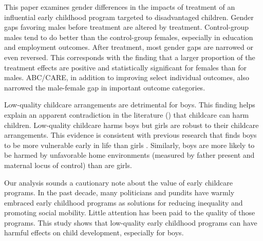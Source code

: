This paper examines gender differences in the impacts of treatment of an influential early childhood program targeted to disadvantaged children. Gender gaps favoring males before treatment are altered by treatment. Control-group males tend to do better than the control-group females, especially in education and employment outcomes. After treatment, most gender gaps are narrowed or even reversed. This corresponds with the finding that a larger proportion of the treatment effects are positive and statistically significant for females than for males. ABC/CARE, in addition to improving select individual outcomes, also narrowed the male-female gap in important outcome categories.

Low-quality childcare arrangements are detrimental for boys. This finding helps explain an apparent contradiction in the literature (\citet{Baker_Gruber_etal_2008_JPE,Baker_Gruber_Milligan_2015_Noncog_Defects,Kottelenberg-Lehrer_2014_Gender-Effects}) that childcare can harm children. Low-quality childcare harms boys but girls are robust to their childcare arrangements. This evidence is consistent with previous research that finds boys to be more vulnerable early in life than girls \citep{golding2016psychology}. Similarly, boys are more likely to be harmed by unfavorable home environments (measured by father present and maternal locus of control) than are girls.

Our analysis sounds a cautionary note about the value of early childcare programs. In the past decade, many politicians and pundits have warmly embraced early childhood programs as solutions for reducing inequality and promoting social mobility. Little attention has been paid to the quality of those programs. This study shows that low-quality early childhood programs can have harmful effects on child development, especially for boys.

